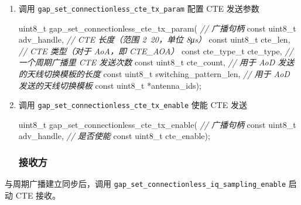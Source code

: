 \documentclass[
  12pt,
]{book}
\newenvironment{Shaded}{\begin{snugshade}}{\end{snugshade}}
\newcommand{\CommentTok}[1]{\textcolor[rgb]{0.56,0.35,0.01}{\textit{#1}}}
\newcommand{\DataTypeTok}[1]{\textcolor[rgb]{0.13,0.29,0.53}{#1}}
\newcommand{\NormalTok}[1]{#1}
\begin{document}
\begin{enumerate}
\def\labelenumi{\arabic{enumi}.}
\item
  调用 \texttt{gap\_set\_connectionless\_cte\_tx\_param} 配置 CTE 发送参数

\begin{Shaded}
\begin{Highlighting}[]
\DataTypeTok{uint8_t}\NormalTok{ gap_set_connectionless_cte_tx_param(}
  \CommentTok{// 广播句柄}
  \DataTypeTok{const} \DataTypeTok{uint8_t}\NormalTok{       adv_handle,}
  \CommentTok{// CTE 长度（范围 2~20，单位 8μs）}
  \DataTypeTok{const} \DataTypeTok{uint8_t}\NormalTok{       cte_len,}
  \CommentTok{// CTE 类型（对于 AoA，即 CTE_AOA）}
  \DataTypeTok{const}\NormalTok{ cte_type_t    cte_type,}
  \CommentTok{// 一个周期广播里 CTE 发送次数}
  \DataTypeTok{const} \DataTypeTok{uint8_t}\NormalTok{       cte_count,}
  \CommentTok{// 用于 AoD 发送的天线切换模板的长度}
  \DataTypeTok{const} \DataTypeTok{uint8_t}\NormalTok{       switching_pattern_len,}
  \CommentTok{// 用于 AoD 发送的天线切换模板}
  \DataTypeTok{const} \DataTypeTok{uint8_t}\NormalTok{      *antenna_ids);}
\end{Highlighting}
\end{Shaded}
\item
  调用 \texttt{gap\_set\_connectionless\_cte\_tx\_enable} 使能 CTE 发送

\begin{Shaded}
\begin{Highlighting}[]
\DataTypeTok{uint8_t}\NormalTok{ gap_set_connectionless_cte_tx_enable(}
  \CommentTok{// 广播句柄}
  \DataTypeTok{const} \DataTypeTok{uint8_t}\NormalTok{       adv_handle,}
  \CommentTok{// 是否使能}
  \DataTypeTok{const} \DataTypeTok{uint8_t}\NormalTok{       cte_enable);}
\end{Highlighting}
\end{Shaded}

  \hypertarget{ux63a5ux6536ux65b9-1}{%
  \subsubsection{接收方}\label{ux63a5ux6536ux65b9-1}}
\end{enumerate}

与周期广播建立同步后，调用 \texttt{gap\_set\_connectionless\_iq\_sampling\_enable} 启动 CTE 接收。
\end{document}
